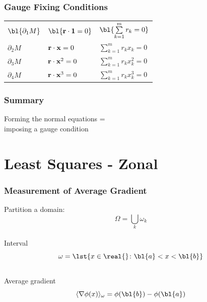 \documentclass[handout]{beamer}
\begin{document}
\begin{frame}      %
\frametitle{Gauge Fixing Conditions}
  \begin{table}[htdp]
    \begin{center}
      \begin{tabular}{lll}
        $\bl{\partial_{1}M}$ & $\bl{{\bf{r}} \cdot {\bf{1}} = 0}$     & $\bl{\sum\limits_{k = 1}^{m} r_{k} = 0}$ \\[15pt]
        $\partial_{2}M$ & ${\bf{r}} \cdot {\bf{x}} = 0$     & $\sum\limits_{k = 1}^{m} r_{k}x_{k} = 0$ \\[15pt]
        $\partial_{3}M$ & ${\bf{r}} \cdot {\bf{x}}^{2} = 0$ & $\sum\limits_{k = 1}^{m} r_{k}x_{k}^{2} = 0$ \\[15pt]
        $\partial_{4}M$ & ${\bf{r}} \cdot {\bf{x}}^{3} = 0$ & $\sum\limits_{k = 1}^{m} r_{k}x_{k}^{3} = 0$ \\[15pt]
      \end{tabular}
    \end{center}
  \end{table}%
  \twodots
\end{frame}

\begin{frame}      %
\frametitle{Summary}
    \begin{center}
      \Huge{Forming the normal equations =\\
      imposing a gauge condition}
    \end{center}
  \twodots
\end{frame}

\section{Least Squares - Zonal}

\begin{frame}      %
\frametitle{Measurement of Average Gradient}
	Partition a domain: \\
	$$\Omega = \bigcup_{k} \omega_{k}$$ \\
  Interval \\
  $$\omega = \lst{x \in\real{} \colon \bl{a} < x < \bl{b}}$$ \\
  \pause
  Average gradient \\
  $$\langle \nabla \phi(x) \rangle_{\omega} = \phi(\bl{b}) - \phi(\bl{a})$$
  \onedot
\end{frame}
\end{document}

